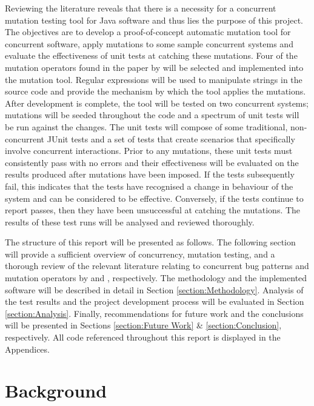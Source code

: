 \documentclass[a4paper,12pt]{article}
\begin{document}
Reviewing the literature reveals that there is a necessity for a concurrent mutation testing tool for Java software and thus lies the purpose of this project. The objectives are to develop a proof-of-concept automatic mutation tool for concurrent software, apply mutations to some sample concurrent systems and evaluate the effectiveness of unit tests at catching these mutations. Four of the mutation operators found in the paper by \citet{bradbury06} will be selected and implemented into the mutation tool. Regular expressions will be used to manipulate strings in the source code and provide the mechanism by which the tool applies the mutations. After development is complete, the tool will be tested on two concurrent systems; mutations will be seeded throughout the code and a spectrum of unit tests will be run against the changes. The unit tests will compose of some traditional, non-concurrent JUnit tests and a set of tests that create scenarios that specifically involve concurrent interactions. Prior to any mutations, these unit tests must consistently pass with no errors and their effectiveness will be evaluated on the results produced after mutations have been imposed. If the tests subsequently fail, this indicates that the tests have recognised a change in behaviour of the system and can be considered to be effective. Conversely, if the tests continue to report passes, then they have been unsuccessful at catching the mutations. The results of these test runs will be analysed and reviewed thoroughly.

The structure of this report will be presented as follows. The following section will provide a sufficient overview of concurrency, mutation testing, and a thorough review of the relevant literature relating to concurrent bug patterns and mutation operators by \citet{farchi03} and \citet{bradbury06}, respectively. The methodology and the implemented software will be described in detail in Section \ref{section:Methodology}. Analysis of the test results and the project development process will be evaluated in Section \ref{section:Analysis}. Finally, recommendations for future work and the conclusions will be presented in Sections \ref{section:Future Work} \& \ref{section:Conclusion}, respectively. All code referenced throughout this report is displayed in the Appendices.        

\newpage
\section{Background}
\end{document}
